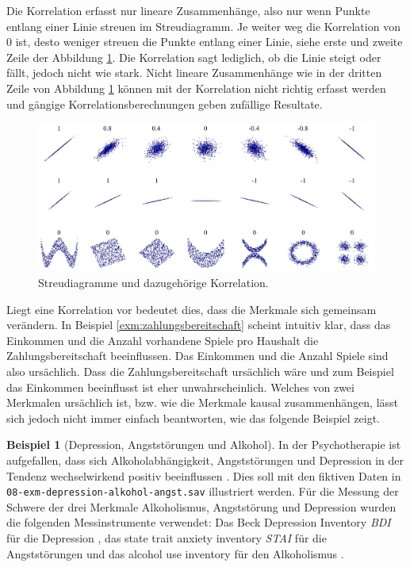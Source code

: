 \documentclass[
]{book}
\theoremstyle{definition}
\theoremstyle{definition}
\newtheorem{example}{Beispiel}[chapter]
\theoremstyle{definition}
\theoremstyle{definition}
\theoremstyle{remark}
\begin{document}
Die Korrelation erfasst nur lineare Zusammenhänge, also nur wenn Punkte entlang einer Linie streuen im Streudiagramm. Je weiter weg die Korrelation von \(0\) ist, desto weniger streuen die Punkte entlang einer Linie, siehe erste und zweite Zeile der Abbildung \ref{fig:correlation-examples}. Die Korrelation sagt lediglich, ob die Linie steigt oder fällt, jedoch nicht wie stark. Nicht lineare Zusammenhänge wie in der dritten Zeile von Abbildung \ref{fig:correlation-examples} können mit der Korrelation nicht richtig erfasst werden und gängige Korrelationsberechnungen geben zufällige Resultate.

\begin{figure}
\includegraphics[width=1\linewidth]{figures/08-correlations-wikipedia} \caption{Streudiagramme und dazugehörige Korrelation.}\label{fig:correlation-examples}
\end{figure}

Liegt eine Korrelation vor bedeutet dies, dass die Merkmale sich gemeinsam verändern. In Beispiel \ref{exm:zahlungsbereitschaft} scheint intuitiv klar, dass das Einkommen und die Anzahl vorhandene Spiele pro Haushalt die Zahlungsbereitschaft beeinflussen. Das Einkommen und die Anzahl Spiele sind also ursächlich. Dass die Zahlungsbereitschaft ursächlich wäre und zum Beispiel das Einkommen beeinflusst ist eher unwahrscheinlich. Welches von zwei Merkmalen ursächlich ist, bzw. wie die Merkmale kausal zusammenhängen, lässt sich jedoch nicht immer einfach beantworten, wie das folgende Beispiel zeigt.

\begin{example}[Depression, Angststörungen und Alkohol]
\protect\hypertarget{exm:depression-alkohol-angst}{}\label{exm:depression-alkohol-angst}In der Psychotherapie ist aufgefallen, dass sich Alkoholabhängigkeit, Angststörungen und Depression in der Tendenz wechselwirkend positiv beeinflussen \citep{schuckit1996}. Dies soll mit den fiktiven Daten in \texttt{08-exm-depression-alkohol-angst.sav} illustriert werden. Für die Messung der Schwere der drei Merkmale Alkoholismus, Angststörung und Depression wurden die folgenden Messinstrumente verwendet: Das Beck Depression Inventory \emph{BDI} für die Depression \citep{beck1988}, das state trait anxiety inventory \emph{STAI} für die Angststörungen \citep{spielberger1983manual} und das alcohol use inventory für den Alkoholismus \citep{skinner1982}.
\end{example}
\end{document}
